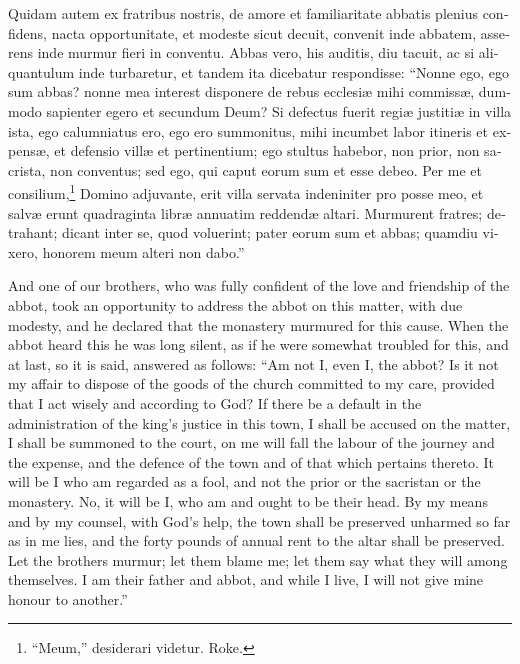 \documentclass{book}
\begin{document}
\begin{paracol}{2}
\switchcolumn*

\begin{otherlanguage}{latin}
Quidam autem ex fratribus nostris, de amore et familiaritate abbatis plenius confidens, nacta opportunitate, et modeste sicut decuit, convenit inde abbatem, asserens inde murmur fieri in conventu. Abbas vero, his auditis, diu tacuit, ac si aliquantulum inde turbaretur, et tandem ita dicebatur respondisse: ``Nonne ego, ego sum abbas? nonne mea interest disponere de rebus ecclesi\ae{} mihi commiss\ae{}, dummodo sapienter egero et secundum Deum? Si defectus fuerit regi\ae{} justiti\ae{} in villa ista, ego calumniatus ero, ego ero summonitus, mihi incumbet labor itineris et expens\ae{}, et defensio vill\ae{} et pertinentium; ego stultus habebor, non prior, non sacrista, non conventus; sed ego, qui caput eorum sum et esse debeo. Per me et consilium,\footnote[\textdagger]{``Meum,'' desiderari videtur. Roke.} Domino adjuvante, erit villa servata indeniniter pro posse meo, et salv\ae{} erunt quadraginta libr\ae{} annuatim reddend\ae{} altari. Murmurent fratres; detrahant; dicant inter se, quod voluerint; pater eorum sum et abbas; quamdiu vixero, honorem meum alteri non dabo.''
\end{otherlanguage}

\switchcolumn

And one of our brothers, who was fully confident of the love and friendship of the abbot, took an opportunity to address the abbot on this matter, with due modesty, and he declared that the monastery murmured for this cause. When the abbot heard this he was long silent, as if he were somewhat troubled for this, and at last, so it is said, answered as follows: ``Am not I, even I, the abbot? Is it not my affair to dispose of the goods of the church committed to my care, provided that I act wisely and according to God? If there be a default in the administration of the king's justice in this town, I shall be accused on the matter, I shall be summoned to the court, on me will fall the labour of the journey and the expense, and the defence of the town and of that which pertains thereto. It will be I who am regarded as a fool, and not the prior or the sacristan or the monastery. No, it will be I, who am and ought to be their head. By my means and by my counsel, with God's help, the town shall be preserved unharmed so far as in me lies, and the forty pounds of annual rent to the altar shall be preserved. Let the brothers murmur; let them blame me; let them say what they will among themselves. I am their father and abbot, and while I live, I will not give mine honour to another.''


\end{paracol}
\end{document}
